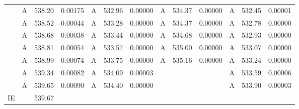 \documentclass[journal=jctcce,manuscript=article]{achemso}
\begin{document}
\begin{table}
\begin{tabular}{l|lcc|lcc|lcc|lcc}
& A & 538.20 & 0.00175 & A & 532.96 & 0.00000 & A & 534.37 & 0.00000 & A & 532.45 & 0.00001 \\
& A & 538.52 & 0.00044 & A & 533.28 & 0.00000 & A & 534.37 & 0.00000 & A & 532.78 & 0.00000 \\
& A & 538.68 & 0.00038 & A & 533.44 & 0.00000 & A & 534.68 & 0.00000 & A & 532.93 & 0.00000 \\
& A & 538.81 & 0.00054 & A & 533.57 & 0.00000 & A & 535.00 & 0.00000 & A & 533.07 & 0.00000 \\
& A & 538.99 & 0.00074 & A & 533.75 & 0.00000 & A & 535.16 & 0.00000 & A & 533.24 & 0.00000 \\
& A & 539.34 & 0.00082 & A & 534.09 & 0.00003 &  &        &         & A & 533.59 & 0.00006 \\
& A & 539.65 & 0.00090 & A & 534.40 & 0.00000 &  &        &         & A & 533.90 & 0.00003 \\
\hline
IE & & 539.67 & 
   & & & 
   & & & 
   & &   \\
\hline
  \end{tabular}
\end{table}
%
\end{document}
